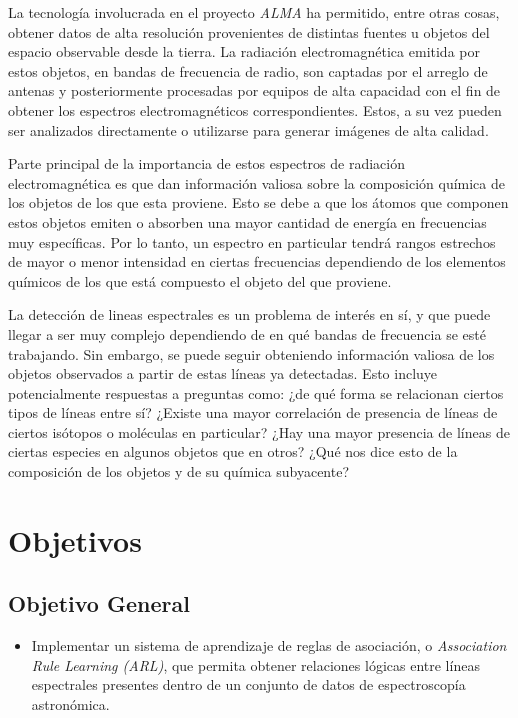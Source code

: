 \begin{intro}
La tecnología involucrada en el proyecto \textit{ALMA} ha permitido, entre otras cosas, obtener datos de alta resolución provenientes de distintas fuentes u objetos del espacio observable desde la tierra. La radiación electromagnética emitida por estos objetos, en bandas de frecuencia de radio, son captadas por el arreglo de antenas y posteriormente procesadas por equipos de alta capacidad con el fin de obtener los espectros electromagnéticos correspondientes. Estos, a su vez pueden ser analizados directamente o utilizarse para generar imágenes de alta calidad.

Parte principal de la importancia de estos espectros de radiación electromagnética es que dan información valiosa sobre la composición química de los objetos de los que esta proviene. Esto se debe a que los átomos que componen estos objetos emiten o absorben una mayor cantidad de energía en frecuencias muy específicas. Por lo tanto, un espectro en particular tendrá rangos estrechos de mayor o menor intensidad en ciertas frecuencias dependiendo de los elementos químicos de los que está compuesto el objeto del que proviene.

La detección de lineas espectrales es un problema de interés en sí, y que puede llegar a ser muy complejo dependiendo de en qué bandas de frecuencia se esté trabajando. Sin embargo, se puede seguir obteniendo información valiosa de los objetos observados a partir de estas líneas ya detectadas. Esto incluye potencialmente respuestas a preguntas como: ¿de qué forma se relacionan ciertos tipos de líneas entre sí? ¿Existe una mayor correlación de presencia de líneas de ciertos isótopos o moléculas en particular? ¿Hay una mayor presencia de líneas de ciertas especies en algunos objetos que en otros? ¿Qué nos dice esto de la composición de los objetos y de su química subyacente?

\section*{Objetivos}

\subsection*{Objetivo General}

\begin{itemize}
	\item Implementar un sistema de aprendizaje de reglas de asociación, o \textit{Association Rule Learning (ARL)}, que permita obtener relaciones lógicas entre líneas espectrales presentes dentro de un conjunto de datos de espectroscopía astronómica.
\end{itemize}


\end{intro}
